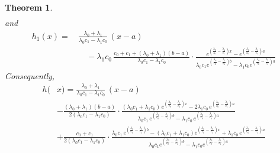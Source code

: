 \documentclass{article}
\newtheorem{thm}{Theorem}
\begin{document}
\begin{thm}
\begin{align}
\end{align}
and
\begin{align}\label{got2drift}h_1(x)=\,&\frac{\lambda_0+\lambda_1}{\lambda_0c_1-\lambda_1c_0}\,(x-a)\nonumber\\
&\quad-\lambda_1c_0\,\frac{c_0+c_1+(\lambda_0+\lambda_1)(b-a)}{\lambda_0c_1-\lambda_1c_0}\cdot\frac{e^{\left(\frac{\lambda_0}{c_0}-\frac{\lambda_1}{c_1}\right)x}-e^{\left(\frac{\lambda_0}{c_0}-\frac{\lambda_1}{c_1}\right)a}}{\lambda_0c_1e^{\left(\frac{\lambda_0}{c_0}-\frac{\lambda_1}{c_1}\right)b}-\lambda_1c_0e^{\left(\frac{\lambda_0}{c_0}-\frac{\lambda_1}{c_1}\right)a}}
\end{align}
Consequently, 
\begin{align}\label{got3drift}h(&x)=\frac{\lambda_0+\lambda_1}{\lambda_0c_1-\lambda_1c_0}\,(x-a)\nonumber\\
&-\frac{(\lambda_0+\lambda_1)(b-a)}{2(\lambda_0c_1-\lambda_1c_0)}\cdot\frac{(\lambda_0c_1+\lambda_1c_0)\,e^{\left(\frac{\lambda_0}{c_0}-\frac{\lambda_1}{c_1}\right)x}-2\lambda_1c_0\,e^{\left(\frac{\lambda_0}{c_0}-\frac{\lambda_1}{c_1}\right)a}}{\lambda_0c_1\,e^{\left(\frac{\lambda_0}{c_0}-\frac{\lambda_1}{c_1}\right)b}-\lambda_1c_0\,e^{\left(\frac{\lambda_0}{c_0}-\frac{\lambda_1}{c_1}\right)a}}\nonumber\\
&+\frac{c_0+c_1}{2(\lambda_0c_1-\lambda_1c_0)}\cdot\frac{\lambda_0c_1\,e^{\left(\frac{\lambda_0}{c_0}-\frac{\lambda_1}{c_1}\right)b}-(\lambda_0c_1+\lambda_1c_0)e^{\left(\frac{\lambda_0}{c_0}-\frac{\lambda_1}{c_1}\right)x}+\lambda_1c_0\,e^{\left(\frac{\lambda_0}{c_0}-\frac{\lambda_1}{c_1}\right)a}}{\lambda_0c_1e^{\left(\frac{\lambda_0}{c_0}-\frac{\lambda_1}{c_1}\right)b}-\lambda_1c_0e^{\left(\frac{\lambda_0}{c_0}-\frac{\lambda_1}{c_1}\right)a}}
\end{align}
\end{thm}
\end{document}

